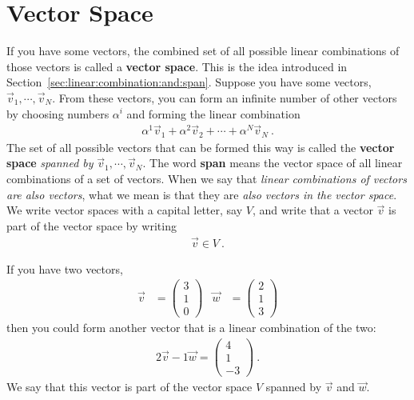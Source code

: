 \section{Vector Space}

If you have some vectors, the combined set of all possible linear combinations of those vectors is called a \textbf{vector space}. This is the idea introduced in Section~\ref{sec:linear:combination:and:span}. Suppose you have some vectors,  $\vec{v}_1, \cdots, \vec{v}_N$. From these vectors, you can form an infinite number of other vectors by choosing numbers $\alpha^i$ and forming the linear combination
\begin{align}
    \alpha^1 \vec{v}_1 + \alpha^2\vec{v}_2 + \cdots + \alpha^N \vec{v}_N \ .
    \label{eq:linear:combination:looks:like:basis}
\end{align}
The set of all possible vectors that can be formed this way is called the \textbf{vector space} \emph{spanned by}  $\vec{v}_1, \cdots, \vec{v}_N$. The word \textbf{span} means the vector space of all linear combinations of a set of vectors. When we say that \emph{linear combinations of vectors are also vectors}, what we mean is that they are \emph{also vectors in the vector space}. We write vector spaces with a capital letter, say $V$, and write that a vector $\vec{v}$ is part of the vector space by writing
\begin{align}
    \vec{v} \in V \ .
\end{align}

\begin{example}
If you have two vectors,
\begin{align}
    \vec{v} &= 
    \begin{pmatrix}
        3 \\ 1 \\ 0
    \end{pmatrix}
    &
    \vec{w} &= 
    \begin{pmatrix}
        2 \\ 1 \\ 3
    \end{pmatrix}
    \label{eq:eg:of:vector:space:1}
\end{align}
then you could form another vector that is a linear combination of the two:
\begin{align}
    2\vec{v} - 1 \vec{w}
    =
    \begin{pmatrix}
        4 \\ 1 \\ -3
    \end{pmatrix} \ .
\end{align}
We say that this vector is part of the vector space $V$ spanned by $\vec{v}$ and $\vec{w}$. 
\end{example}

